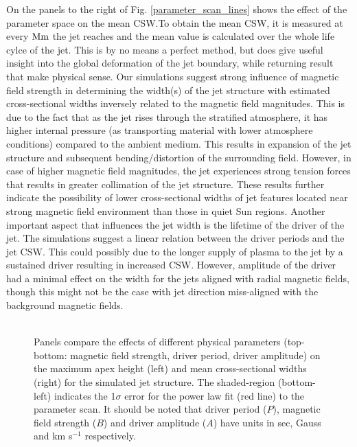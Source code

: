 \documentclass[12pt]{ociamthesis}
\newcommand{\fref}[1]{Fig. \eqref{#1}}
\newcommand{\np}{\\ \\}
\begin{document}
On the panels to the right of \fref{parameter_scan_lines} shows the effect of the parameter space on the mean CSW.To obtain the mean CSW, it is measured at every $\rm{Mm}$ the jet reaches and the mean value is calculated over the whole life cylce of the jet. This is by no means a perfect method, but does give useful insight into the global deformation of the jet boundary, while returning result that make physical sense. Our simulations suggest strong influence of magnetic field strength in determining the width(s) of the jet structure with estimated cross-sectional widths inversely related to the magnetic field magnitudes. This is due to the fact that as the jet rises through the stratified atmosphere, it has higher internal pressure (as transporting material with lower atmosphere conditions) compared to the ambient medium. This results in expansion of the jet structure and subsequent bending/distortion of the surrounding field. However, in case of higher magnetic field magnitudes, the jet experiences strong tension forces that results in greater collimation of the jet structure. These results further indicate the possibility of lower cross-sectional widths of jet features located near strong magnetic field environment than those in quiet Sun regions. Another important aspect that influences the jet width is the lifetime of the driver of the jet. The simulations suggest a linear relation between the driver periods and the jet CSW. This could possibly due to the longer supply of plasma to the jet by a sustained driver resulting in increased CSW. However, amplitude of the driver had a minimal effect on the width for the jets aligned with radial magnetic fields, though this might not be the case with jet direction miss-aligned with the background magnetic fields. \np
\begin{figure}
\captionsetup[subfigure]{labelformat=empty}
\centering
{} 
\caption{Panels compare the effects of different physical parameters (top-bottom: magnetic field strength, driver period, driver amplitude) on the maximum apex height (left) and mean cross-sectional widths (right) for the simulated jet structure. The shaded-region (bottom-left) indicates the 1$\sigma$ error for the power law fit (red line) to the parameter scan. It should be noted that driver period ($P$), magnetic field strength ($B$) and driver amplitude ($A$) have units in sec, Gauss and km s$^{-1}$ respectively.}
\label{parameter_scan_lines}
\end{figure}
\end{document}
